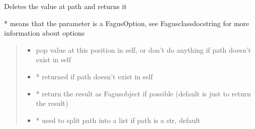 \documentclass[a4paper,10pt,english]{sphinxmanual}
\begin{document}
\begin{fulllineitems}
\begin{fulllineitems}
\begin{quote}
\begin{description}
\begin{itemize}
\end{itemize}

\end{description}\end{quote}

\end{fulllineitems}


\begin{fulllineitems}
\label{\detokenize{fagus:fagus.Fagus.pop}}
\pysigstartsignatures
{}
\pysigstopsignatures
\sphinxAtStartPar
Deletes the value at path and returns it

\sphinxAtStartPar
* means that the parameter is a FagusOption, see Fagus\sphinxhyphen{}class\sphinxhyphen{}docstring for more information about options
\begin{quote}\begin{description}
\begin{itemize}
\item {}
\sphinxAtStartPar
{} \textendash{} pop value at this position in self, or don’t do anything if path doesn’t exist in self

\item {}
\sphinxAtStartPar
{} \textendash{} * returned if path doesn’t exist in self

\item {}
\sphinxAtStartPar
{} \textendash{} * return the result as Fagus\sphinxhyphen{}object if possible (default is just to return the result)

\item {}
\sphinxAtStartPar
{} \textendash{} * used to split path into a list if path is a str, default 


\end{itemize}
\end{description}
\end{quote}
\end{fulllineitems}
\end{fulllineitems}
\end{document}
